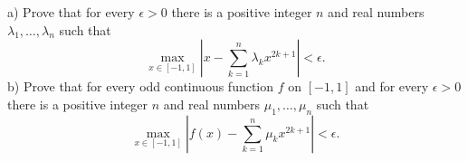 a) Prove that for every $\epsilon>0$ there is a positive integer $n$ and real
numbers $\lambda_{1},\dots,\lambda_{n}$ such that
$$\max_{x\in [-1,1]}|x-\sum_{k=1}^{n}\lambda_{k}x^{2k+1}|<\epsilon.$$b) Prove that for every odd continuous function $f$ on $[-1,1]$ and for every $\epsilon>0$ there is a positive integer $n$ and real numbers $\mu_{1},\dots,\mu_{n}$ such that
$$\max_{x\in [-1,1]}|f(x)-\sum_{k=1}^{n}\mu_{k}x^{2k+1}|<\epsilon.$$